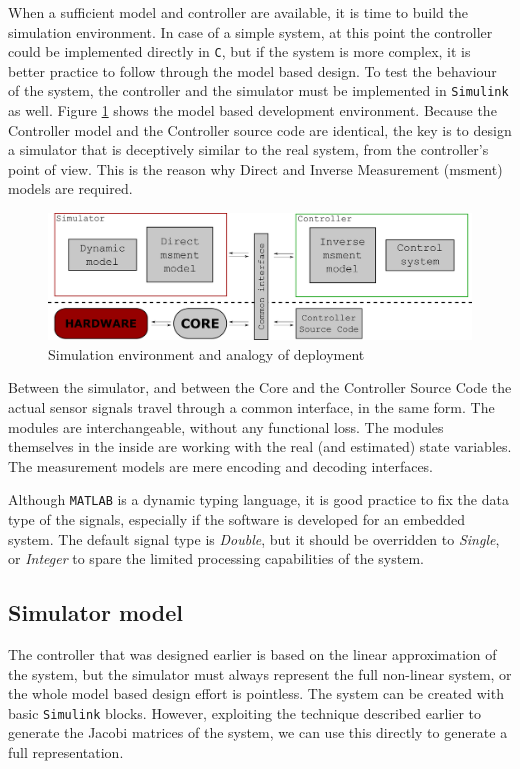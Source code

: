 When a sufficient model and controller are available, it is time to build the simulation environment. In case of a simple system, at this point the controller could be implemented directly in \verb!C!, but if the system is more complex, it is better practice to follow through the model based design. To test the behaviour of the system, the controller and the simulator must be implemented in \verb!Simulink! as well. Figure \ref{fig:simenvironment} shows the model based development environment. Because the Controller model and the Controller source code are identical, the key is to design a simulator that is deceptively similar to the real system, from the controller's point of view. This is the reason why Direct and Inverse Measurement (msment) models are required.

\begin{figure}[!ht]
    \centering
    \includegraphics[width=0.7\linewidth]{img/simenvironment}
    \centering
    \caption{Simulation environment and analogy of deployment}
    \label{fig:simenvironment}
\end{figure}

Between the simulator, and between the Core and the Controller Source Code the actual sensor signals travel through a common interface, in the same form. The modules are interchangeable, without any functional loss. The modules themselves in the inside are working with the real (and estimated) state variables. The measurement models are mere encoding and decoding interfaces.

Although \verb!MATLAB! is a dynamic typing language, it is good practice to fix the data type of the signals, especially if the software is developed for an embedded system. The default signal type is \emph{Double}, but it should be overridden to \emph{Single}, or \emph{Integer} to spare the limited processing capabilities of the system.

\subsection{Simulator model}

The controller that was designed earlier is based on the linear approximation of the system, but the simulator must always represent the full non-linear system, or the whole model based design effort is pointless. The system can be created with basic \verb!Simulink! blocks. However, exploiting the technique described earlier to generate the Jacobi matrices of the system, we can use this directly to generate a full representation.

